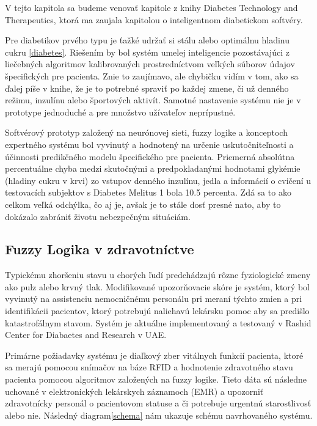V tejto kapitola sa budeme venovať kapitole z knihy Diabetes Technology and Therapeutics\cite{2000}, ktorá ma zaujala kapitolou o inteligentnom diabetickom softvéry.

Pre diabetikov prvého typu je ťažké udržať si stálu alebo optimálnu hladinu cukru \ref{diabetes}. Riešením by bol systém umelej inteligencie pozostávajúci z liečebných algoritmov kalibrovaných prostredníctvom veľkých súborov údajov špecifických pre pacienta.\cite{2000} Znie to zaujímavo, ale chybičku vidím v tom, ako sa ďalej píše v knihe, že je to potrebné spraviť po každej zmene, či už denného režimu, inzulínu alebo športových aktivít. Samotné nastavenie systému nie je v prototype jednoduché a pre množstvo užívateľov neprípustné. 

Softvérový prototyp založený na neurónovej sieti, fuzzy logike a konceptoch expertného systému bol vyvinutý a hodnotený na určenie uskutočniteľnosti a účinnosti predikčného modelu špecifického pre pacienta. Priemerná absolútna percentuálne chyba medzi skutočnými a predpokladanými hodnotami glykémie (hladiny cukru v krvi) zo vstupov denného inzulínu, jedla a informácií o cvičení u testovacích subjektov s Diabetes Melitus 1 bola 10.5 percenta.\cite{2000}
Zdá sa to ako celkom veľká odchýlka, čo aj je, avšak je to stále dosť presné nato, aby to dokázalo zabrániť životu nebezpečným situáciám. 

\subsection{Fuzzy Logika v zdravotníctve}

Typickému zhoršeniu stavu u chorých ľudí predchádzajú rôzne fyziologické zmeny ako pulz alebo krvný tlak. Modifikované upozorňovacie skóre je systém, ktorý bol vyvinutý na assistenciu nemocničnému personálu pri meraní týchto zmien a pri identifikácii pacientov, ktorý potrebujú naliehavú lekársku pomoc aby sa predišlo katastrofálnym stavom. \cite{2019} Systém je aktuálne implementovaný a testovaný v Rashid Center for Diabaetes and Research v UAE.

Primárne požiadavky systému je diaľkový zber vitálnych funkcií pacienta, ktoré sa merajú pomocou snímačov na báze RFID a hodnotenie zdravotného stavu pacienta pomocou algoritmov založených na fuzzy logike.  Tieto dáta sú následne uchované v elektronických lekárskych záznamoch (EMR) a upozorniť zdravotnícky personál o pacientovom statuse a či potrebuje urgentnú starostlivosť alebo nie. \cite{2019} Následný diagram\ref{schema} nám ukazuje schému navrhovaného systému.

